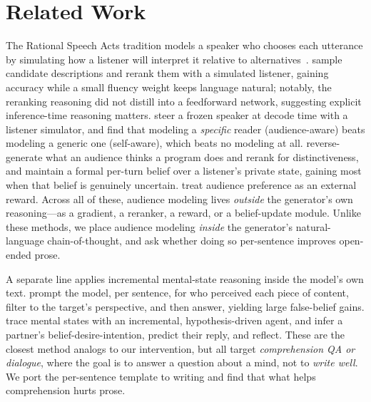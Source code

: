 \section{Related Work}
\label{sec:related}

 The Rational Speech Acts tradition models a
speaker who chooses each utterance by simulating how a listener will interpret it relative to
alternatives~\citep{andreas2016reasoning,fried2023pragmatics}. \citet{andreas2016reasoning} sample
candidate descriptions and rerank them with a simulated listener, gaining accuracy while a small
fluency weight keeps language natural; notably, the reranking reasoning did not distill into a
feedforward network, suggesting explicit inference-time reasoning matters. \citet{takmaz2023speaking}
steer a frozen speaker at decode time with a listener simulator, and find that modeling a
\emph{specific} reader (audience-aware) beats modeling a generic one (self-aware), which beats no
modeling at all. \citet{coderesa2025} reverse-generate what an audience thinks a program does and
rerank for distinctiveness, and \citet{crsa2025} maintain a formal per-turn belief over a
listener's private state, gaining most when that belief is genuinely uncertain.
\citet{styleinfusion2023} treat audience preference as an external reward. Across all of these,
audience modeling lives \emph{outside} the generator's own reasoning---as a gradient, a reranker,
a reward, or a belief-update module. Unlike these methods, we place audience modeling
\emph{inside} the generator's natural-language chain-of-thought, and ask whether doing so
per-sentence improves open-ended prose.

 A separate line applies incremental
mental-state reasoning inside the model's own text. \citet{perceptom2024} prompt the model, per
sentence, for who perceived each piece of content, filter to the target's perspective, and then
answer, yielding large false-belief gains. \citet{thoughttracing2025} trace mental states with an
incremental, hypothesis-driven agent, and \citet{tomagent2025} infer a partner's
belief-desire-intention, predict their reply, and reflect. These are the closest method analogs to
our intervention, but all target \emph{comprehension QA or dialogue}, where the goal is to answer
a question about a mind, not to \emph{write well}. We port the per-sentence template to writing and
find that what helps comprehension hurts prose.

